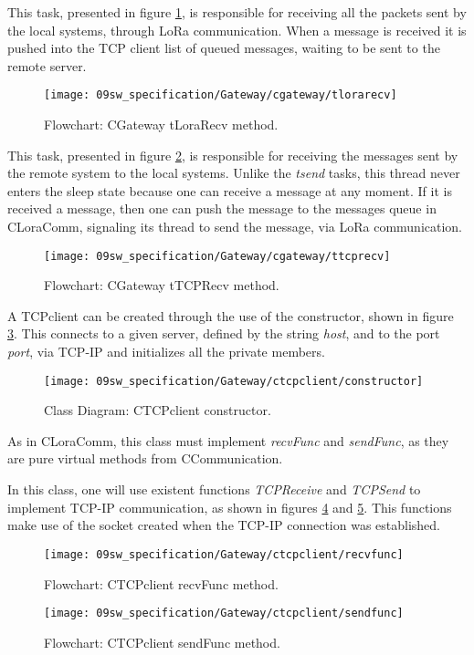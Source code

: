 \clearpage
This task, presented in figure \ref{fig:gwtLoraRecv}, is responsible for receiving all the packets sent by the local systems, through LoRa communication. When a message is received it is pushed into the TCP client list of queued messages, waiting to be sent to the remote server.

\begin{figure}[H]
	\centering
	\texttt{[image: 09sw\_specification/Gateway/cgateway/tlorarecv]}
	\caption{Flowchart: CGateway tLoraRecv method.}
	\label{fig:gwtLoraRecv}
\end{figure}

\clearpage
This task, presented in figure \ref{fig:gwtTCPRecv}, is responsible for receiving the messages sent by the remote system to the local systems. Unlike the \textit{tsend} tasks, this thread never enters the sleep state because one can receive a message at any moment. If it is received a message, then one can push the message to the messages queue in CLoraComm, signaling its thread to send the message, via LoRa communication.

\begin{figure}[H]
	\centering
	\texttt{[image: 09sw\_specification/Gateway/cgateway/ttcprecv]}
	\caption{Flowchart: CGateway tTCPRecv method.}
	\label{fig:gwtTCPRecv}
\end{figure}

\clearpage
{}

A TCPclient can be created through the use of the constructor, shown in figure \ref{fig:TCPclientconstructor}. This connects to a given server, defined by the string \textit{host}, and to the port \textit{port}, via TCP-IP and initializes all the private members.

\begin{figure}[H]
	\centering
	\texttt{[image: 09sw\_specification/Gateway/ctcpclient/constructor]}
	\caption{Class Diagram: CTCPclient constructor.}
	\label{fig:TCPclientconstructor}
\end{figure}

As in CLoraComm, this class must implement \textit{recvFunc} and \textit{sendFunc}, as they are pure virtual methods from CCommunication. 

In this class, one will use existent functions \textit{TCPReceive} and \textit{TCPSend} to implement TCP-IP communication, as shown in figures \ref{fig:TCPclientrecvfunc} and \ref{fig:TCPclientsendfunc}. This functions make use of the socket created when the TCP-IP connection was established.

\begin{figure}[H]
	\centering
	\texttt{[image: 09sw\_specification/Gateway/ctcpclient/recvfunc]}
	\caption{Flowchart: CTCPclient recvFunc method.}
	\label{fig:TCPclientrecvfunc}
\end{figure}

\begin{figure}[H]
	\centering
	\texttt{[image: 09sw\_specification/Gateway/ctcpclient/sendfunc]}
	\caption{Flowchart: CTCPclient sendFunc method.}
	\label{fig:TCPclientsendfunc}
\end{figure}